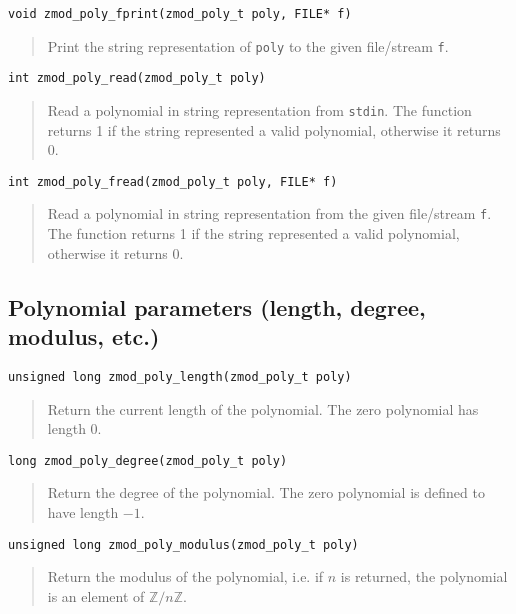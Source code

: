 \documentclass[a4paper,10pt]{article}
\newcommand{\Z}{\mathbb{Z}}
\newcommand{\code}{\lstinline}
\begin{document}
\begin{lstlisting}
void zmod_poly_fprint(zmod_poly_t poly, FILE* f)
\end{lstlisting}
\begin{quote}
Print the string representation of \code{poly} to the given file/stream \code{f}.
\end{quote}

\begin{lstlisting}
int zmod_poly_read(zmod_poly_t poly)
\end{lstlisting}
\begin{quote}
Read a polynomial in string representation from \code{stdin}. The function returns 1 if the string represented a valid polynomial, otherwise it returns 0.
\end{quote}

\begin{lstlisting}
int zmod_poly_fread(zmod_poly_t poly, FILE* f)
\end{lstlisting}
\begin{quote}
Read a polynomial in string representation from the given file/stream \code{f}. The function returns 1 if the string represented a valid polynomial, otherwise it returns 0.
\end{quote}

\subsection{Polynomial parameters (length, degree, modulus, etc.)}
\begin{lstlisting}
unsigned long zmod_poly_length(zmod_poly_t poly)
\end{lstlisting}
\begin{quote}
Return the current length of the polynomial. The zero polynomial has length 0.
\end{quote}

\begin{lstlisting}
long zmod_poly_degree(zmod_poly_t poly)
\end{lstlisting}
\begin{quote}
Return the degree of the polynomial. The zero polynomial is defined to have length $-1$.
\end{quote}

\begin{lstlisting}
unsigned long zmod_poly_modulus(zmod_poly_t poly)
\end{lstlisting}
\begin{quote}
Return the modulus of the polynomial, i.e. if $n$ is returned, the polynomial is an element of $\Z/n\Z$.\end{quote}
\end{document}
